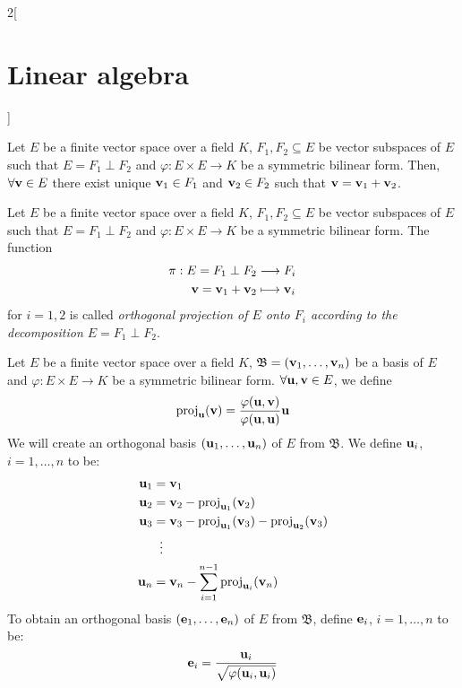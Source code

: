 \documentclass[../../../main.tex]{subfiles}
\begin{document}
\begin{multicols}{2}[\section{Linear algebra}]
\begin{definition}
\end{definition}
\begin{prop}
    Let $E$ be a finite vector space over a field $K$, $F_1,F_2\subseteq E$ be vector subspaces of $E$ such that $E=F_1\perp F_2$ and $\varphi:E\times E\rightarrow K$ be a symmetric bilinear form. Then, $\forall \vb{v}\in E$ there exist unique $\vb{v}_1\in F_1$ and $\vb{v}_2\in F_2$ such that $\vb{v}=\vb{v}_1+\vb{v}_2$.
\end{prop}
\begin{definition}\label{perpendicular}
    Let $E$ be a finite vector space over a field $K$, $F_1,F_2\subseteq E$ be vector subspaces of $E$ such that $E=F_1\perp F_2$ and $\varphi:E\times E\rightarrow K$ be a symmetric bilinear form. The function
    \begin{align*}
        \pi:E=F_1\perp F_2&\longrightarrow F_i\\
        \vb{v}=\vb{v}_1+\vb{v}_2&\longmapsto \vb{v}_i
    \end{align*}
    for $i=1,2$ is called \textit{orthogonal projection of $E$ onto $F_i$ according to the decomposition $E=F_1\perp F_2$}.
\end{definition}
\begin{method}
    Let $E$ be a finite vector space over a field $K$, $\mathfrak{B}=(\vb{v}_1,\ldots,\vb{v}_n)$ be a basis of $E$ and $\varphi:E\times E\rightarrow K$ be a symmetric bilinear form. $\forall\vb{u},\vb{v}\in E$, we define $$\text{proj}_{\vb{u}}(\vb{v})=\frac{\varphi(\vb{u},\vb{v})}{\varphi(\vb{u},\vb{u})}\vb{u}$$ We will create an orthogonal basis $(\vb{u}_1,\ldots,\vb{u}_n)$ of $E$ from $\mathfrak{B}$. We define $\vb{u}_i$, $i=1,\ldots,n$ to be:
    \begin{align*}
        \vb{u}_1&=\vb{v}_1\\
        \vb{u}_2&=\vb{v}_2-\text{proj}_{\vb{u}_1}(\vb{v}_2)\\
        \vb{u}_3&=\vb{v}_3-\text{proj}_{\vb{u}_1}(\vb{v}_3)-\text{proj}_{\vb{u}_2}(\vb{v}_3)\\
        &\;\;\vdots\\
        \vb{u}_n&=\vb{v}_n-\sum_{i=1}^{n-1}\text{proj}_{\vb{u}_i}(\vb{v}_n)
    \end{align*}
    To obtain an orthogonal basis $(\vb{e}_1,\ldots,\vb{e}_n)$ of $E$ from $\mathfrak{B}$, define $\vb{e}_i$, $i=1,\ldots,n$ to be: $$\vb{e}_i=\frac{\vb{u}_i}{\sqrt{\varphi(\vb{u}_i,\vb{u}_i)}}$$
\end{method}

\end{multicols}
\end{document}
